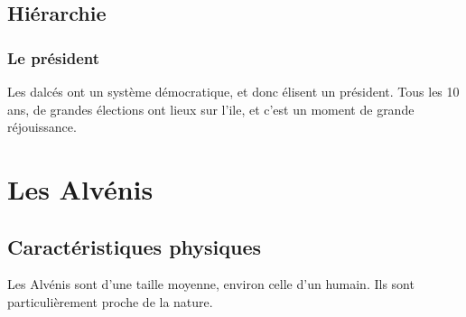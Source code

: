 \subsection{Hiérarchie}
\subsubsection{Le président}
Les dalcés ont un système démocratique, et donc élisent un président. Tous les 10 ans, de grandes élections ont lieux sur l'ile, et c'est un moment de grande réjouissance.

\section{Les Alvénis}
\subsection{Caractéristiques physiques}
Les Alvénis sont d'une taille moyenne, environ celle d'un humain. Ils sont particulièrement proche de la nature.
